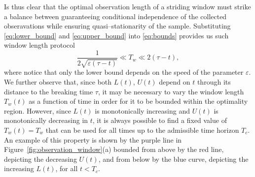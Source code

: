 \documentclass[openacc]{rsproca_new}
\begin{document}
Is thus clear that the optimal observation length of a striding window must strike a balance between guaranteeing conditional independence of the collected obseravations while ensuring quasi--stationarity of the sample.
Substituting \eqref{eq:lower_bound} and \eqref{eq:upper_bound} into \eqref{eq:bounds} provides us such window length protocol
%
\begin{equation}\label{eq:window_length}
  \frac{1}{2\sqrt{\varepsilon(\tau-t)}}\ll T_w \ll 2(\tau - t),
\end{equation}
%
where notice that only the lower bound depends on the speed of the parameter $\varepsilon$.
We further observe that, since both $L(t)$, $U(t)$ depend on $t$ through its distance to the breaking time $\tau$, it may be necessary to vary the window length $T_w(t)$ as a function of time in order for it to be bounded within the optimality region. 
However, since $L(t)$ is monotonically increasing and $U(t)$ is monotonically decreasing in $t$, it is always possible to find a fixed value of $T_w(t)=T_w$ that can be used for all times up to the admissible time horizon $T_c$.
An example of this property is shown by the purple line in Figure~\ref{fig:observation_window}(a) bounded from above by the red line, depicting the decreasing $U(t)$, and from below by the blue curve, depicting the increasing $L(t)$, for all $t<T_c$.
\end{document}
